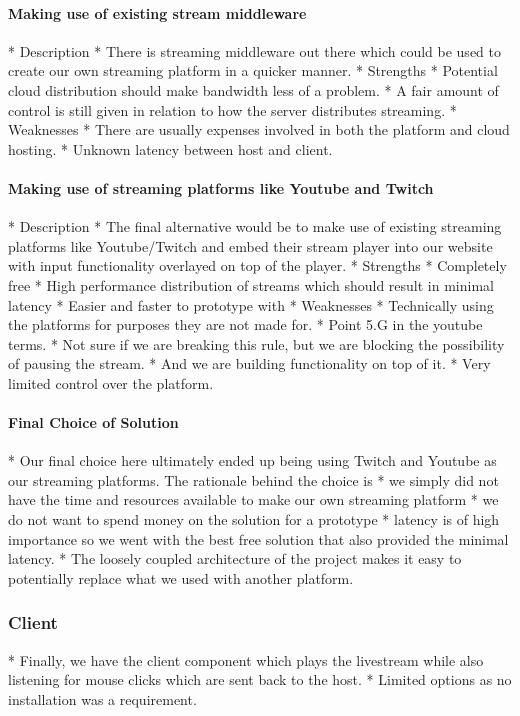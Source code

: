 \paragraph{Making use of existing stream middleware}
    * Description
        * There is streaming middleware out there which could be used to create our own streaming platform in a quicker manner. 
    * Strengths
        * Potential cloud distribution should make bandwidth less of a problem.
        * A fair amount of control is still given in relation to how the server distributes streaming. 
    * Weaknesses
        * There are usually expenses involved in both the platform and cloud hosting.
        * Unknown latency between host and client. 
\paragraph{Making use of streaming platforms like Youtube and Twitch}
    * Description
        * The final alternative would be to make use of existing streaming platforms like Youtube/Twitch and embed their stream player into our website with input functionality overlayed on top of the player. 
    * Strengths
        * Completely free
        * High performance distribution of streams which should result in minimal latency
        * Easier and faster to prototype with
    * Weaknesses
        * Technically using the platforms for purposes they are not made for.
            * Point 5.G in the youtube terms. 
                * Not sure if we are breaking this rule, but we are blocking the possibility of pausing the stream.  
                * And we are building functionality on top of it.
        * Very limited control over the platform. 
\paragraph{Final Choice of Solution}
    * Our final choice here ultimately ended up being using Twitch and Youtube as our streaming platforms. The rationale behind the choice is
        * we simply did not have the time and resources available to make our own streaming platform
        * we do not want to spend money on the solution for a prototype
        * latency is of high importance so we went with the best free solution that also provided the minimal latency. 
    * The loosely coupled architecture of the project makes it easy to potentially replace what we used with another platform.

\subsubsection{Client} %
    * Finally, we have the client component which plays the livestream while also listening for mouse clicks which are sent back to the host. 
    * Limited options as no installation was a requirement.
